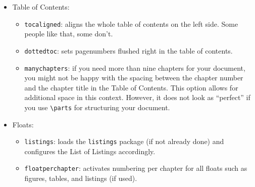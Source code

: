 \begin{itemize}
\begin{itemize}
        \item\texttt{eulermath}: loads the awesome Euler fonts for math. 
        Pala\-tino is used as default font.
        
        \item\texttt{pdfspacing}: makes use of pdftex' letter spacing
        capabilities via the \texttt{microtype} package.\footnote{Use 
            \texttt{microtype}'s \texttt{DVIoutput} option to generate
            DVI with pdftex.} This fixes some serious issues regarding 
        math formul\ae\ etc. (\eg, ``\ss'') in headers. 
        
        \item\texttt{minionprospacing}: uses the internal \texttt{textssc}
        command of the \texttt{MinionPro} package for letter spacing. This 
        automatically enables the \texttt{minionpro} option, overriding
        \texttt{pdfspacing}.
        
    \end{itemize}  
    
    \item Table of Contents:
    \begin{itemize}
        \item\texttt{tocaligned}: aligns the whole table of contents on
        the left side. Some people like that, some don't.
        
        \item\texttt{dottedtoc}: sets pagenumbers flushed right in the 
        table of contents.
        
        \item\texttt{manychapters}: if you need more than nine chapters for 
        your document, you might not be happy with the spacing between the 
        chapter number and the chapter title in the Table of Contents. 
        This option allows for additional space in this context. 
        However, it does not look as ``perfect'' if you use
        \verb|\parts| for structuring your document.
        
    \end{itemize}
    
    \item Floats:
    \begin{itemize}
        \item\texttt{listings}: loads the \texttt{listings} package (if not 
        already done) and configures the List of Listings accordingly.
        
        \item\texttt{floatperchapter}: activates numbering per chapter for
        all floats such as figures, tables, and listings (if used). 
        

\end{itemize}
\end{itemize}

